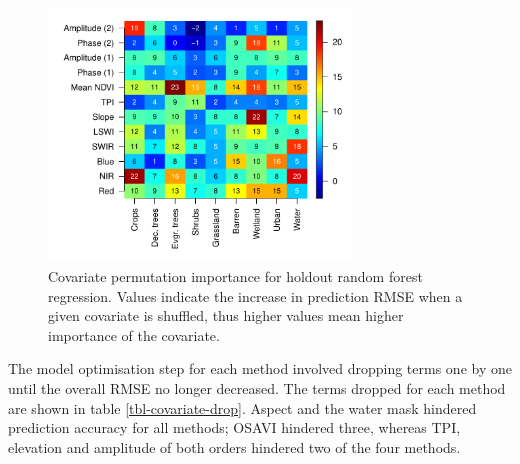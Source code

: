 \documentclass[a4paper,12pt]{scrbook}
\begin{document}
\begin{figure}
  \centering
  \includegraphics[width=0.72\textwidth]{thesis-figures/variable-importance}
  \caption{Covariate permutation importance for holdout random forest regression. Values indicate the increase in prediction RMSE when a given covariate is shuffled, thus higher values mean higher importance of the covariate.}
  \label{fig-variable-importance}
\end{figure}

The model optimisation step for each method involved dropping terms one by one until the overall RMSE no longer decreased. The terms dropped for each method are shown in table \ref{tbl-covariate-drop}. Aspect and the water mask hindered prediction accuracy for all methods; OSAVI hindered three, whereas TPI, elevation and amplitude of both orders hindered two of the four methods.

\begin{table}
  \centering
  \caption{Covariates dropped in the model optimisation step for each method.}
  \label{tbl-covariate-drop}
\end{table}
\end{document}
